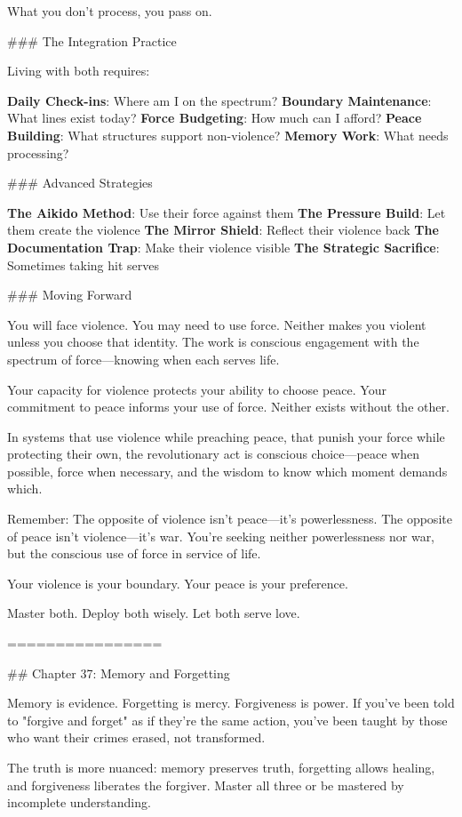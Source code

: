\documentclass[12pt]{book}
\begin{document}
What you don't process, you pass on.

\#\#\# The Integration Practice

Living with both requires:

\textbf{Daily Check-ins}: Where am I on the spectrum?
\textbf{Boundary Maintenance}: What lines exist today?
\textbf{Force Budgeting}: How much can I afford?
\textbf{Peace Building}: What structures support non-violence?
\textbf{Memory Work}: What needs processing?

\#\#\# Advanced Strategies

\textbf{The Aikido Method}: Use their force against them
\textbf{The Pressure Build}: Let them create the violence
\textbf{The Mirror Shield}: Reflect their violence back
\textbf{The Documentation Trap}: Make their violence visible
\textbf{The Strategic Sacrifice}: Sometimes taking hit serves

\#\#\# Moving Forward

You will face violence. You may need to use force. Neither makes you violent unless you choose that identity. The work is conscious engagement with the spectrum of force—knowing when each serves life.

Your capacity for violence protects your ability to choose peace. Your commitment to peace informs your use of force. Neither exists without the other.

In systems that use violence while preaching peace, that punish your force while protecting their own, the revolutionary act is conscious choice—peace when possible, force when necessary, and the wisdom to know which moment demands which.

Remember: The opposite of violence isn't peace—it's powerlessness. The opposite of peace isn't violence—it's war. You're seeking neither powerlessness nor war, but the conscious use of force in service of life.

Your violence is your boundary. Your peace is your preference.

Master both. Deploy both wisely. Let both serve love.

================

\#\# Chapter 37: Memory and Forgetting

Memory is evidence. Forgetting is mercy. Forgiveness is power. If you've been told to "forgive and forget" as if they're the same action, you've been taught by those who want their crimes erased, not transformed.

The truth is more nuanced: memory preserves truth, forgetting allows healing, and forgiveness liberates the forgiver. Master all three or be mastered by incomplete understanding.
\end{document}
